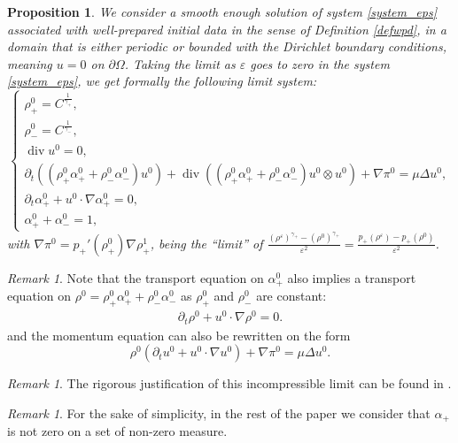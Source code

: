 \documentclass[11pt, twoside, a4paper]{article}
\theoremstyle{plain}
\newtheorem{proposition}[theorem]{Proposition}
\theoremstyle{remark}
\newtheorem{remark}[theorem]{Remark}
\numberwithin{equation}{section}
\renewcommand{\div}{\operatorname{div}}
\newcommand{\dt}{\partial_t}
\newcommand{\eps}{\varepsilon}
\newcommand{\ap}{\alpha_+}
\newcommand{\am}{\alpha_-}
\newcommand{\rp}{\rho_+}
\newcommand{\rmi}{\rho_-}
\newcommand{\gp}{\gamma_{+}}
\newcommand{\gm}{\gamma_-}
\begin{document}
\begin{proposition}
We consider a smooth enough solution of system \eqref{system_eps} associated with well-prepared initial data in the sense of Definition \eqref{defwpd}, in a domain that is either periodic or bounded with the Dirichlet boundary conditions, meaning $u = 0$ on $\partial \Omega$. Taking the limit as $\eps$ goes to zero in the system \eqref{system_eps}, we get formally the following limit system:
\begin{equation}\label{limitsys}
    \begin{cases}
        \rp^0 = C^{\frac{1}{\gp}},\\
        \rmi^0 = C^{\frac{1}{\gm}},\\
        \div u^0 = 0,\\
        \dt(\left(\rp^0 \ap^0 + \rmi^0 \am^0 \right) u^0) + \div( \left(\rp^0 \ap^0 + \rmi^0 \am^0 \right) u^0\otimes u^0) + \nabla \pi^0 = \mu \Delta u^0,\\
        \dt \ap^0 + u^0 \cdot \nabla \ap^0 =0,\\
        \ap^0 + \am^0 = 1,
    \end{cases}
\end{equation}
with $\nabla \pi^0 = p_+'(\rho_+^0) \nabla \rho_+^1$, being the ``limit'' of $\frac{(\rho^\eps)^{\gamma_+}-(\rho^0)^{\gamma_+}}{\eps^2}=\frac{p_+(\rho^\eps)-p_+(\rho^0)}{\eps^2}$.
\end{proposition}

\begin{remark}
Note that the transport equation on $\alpha_+^0$ also implies a transport equation on $\rho^0=\rp^0 \ap^0 + \rmi^0 \am^0$ as $\rp^0$ and $\rmi^0$ are constant:
\begin{align*}
    \dt \rho^0 + u^0 \cdot \nabla \rho^0 = 0.
\end{align*}
and the momentum equation can also be rewritten on the form
\[
\rho^0 \left( \dt u^0 +  u^0\cdot \nabla  u^0 \right) + \nabla \pi^0 = \mu \Delta u^0.
\]
\end{remark}

\begin{remark}
    The rigorous justification of this incompressible limit can be found in \cite{lebot2026low}.
\end{remark}


\begin{remark}
For the sake of simplicity, in the rest of the paper we consider that $\ap$ is not zero on a set of non-zero measure.
\end{remark}
\end{document}
